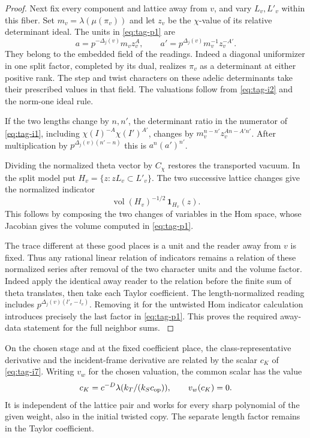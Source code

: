 \begin{proof}

Next fix every component and lattice away from \(v\), and vary
\(L_v,L'_v\) within this fiber. Set \(m_v=\lambda(\mu(\pi_v))\)
and let \(z_v\) be the \(\chi\)-value of its relative
determinant ideal. The units in \eqref{eq:tag-p1} are
\[
     a=p^{-\Delta_j(v)}m_v z_v^{A},
   \qquad a'=p^{\Delta_j(v)}m_v^{-1}z_v^{-A'} .
 \tag{I6}\label{eq:tag-i6}
\]
They belong to the embedded field of the readings. Indeed a
diagonal uniformizer in one split factor, completed by its dual,
realizes \(\pi_v\) as a determinant at either positive rank.
The step and twist characters on these adelic determinants take
their prescribed values in that field. The valuations follow from
\eqref{eq:tag-i2} and the norm-one ideal rule.

If the two lengths change by
\(n,n'\), the determinant ratio in the numerator of \eqref{eq:tag-i1},
including \(\chi(I)^{-A}\chi(I')^{A'}\), changes by
\(m_v^{n-n'}z_v^{An-A'n'}\). After multiplication by
\(p^{\Delta_j(v)(n'-n)}\) this is \(a^n(a')^{n'}\).


Dividing the normalized theta vector by \(C_\chi\) restores the
transported vacuum. In the split model put \(H_v=\{z:zL_v\subset L'_v\}\). The two successive lattice changes give the normalized indicator
\[
  \operatorname{vol}(H_v)^{-1/2}\,\mathbf1_{H_v}(z).
\]
 This follows by composing the two changes of variables
in the Hom space, whose Jacobian gives the volume computed in
\eqref{eq:tag-p1}.

The trace different at these good places is a unit and
the reader away from \(v\) is fixed. Thus any rational linear
relation of indicators remains a relation of these normalized
series after removal of the two character units and the volume
factor. Indeed apply the identical away reader to the relation
before the finite sum of theta translates, then take each Taylor
coefficient. The length-normalized reading includes
\(p^{\Delta_j(v)(l'_v-l_v)}\). Removing it for the untwisted Hom
indicator calculation introduces precisely the last factor in
\eqref{eq:tag-p1}. This proves the required away-data statement for the full
neighbor sums. \label{cor:incident-sections-4}

\end{proof}

\begin{proposition}\label{prop:incident-reading-scalar}
On the chosen stage and at the fixed coefficient place, the
class-representative derivative and the incident-frame derivative
are related by the scalar \(c_K\) of \textup{\eqref{eq:tag-i7}}. Writing \(v_w\) for the chosen valuation, the common scalar has the value
\[
 c_K=c^{-D}\lambda(k_T/(k_S c_{\rm op})),\qquad v_w(c_K)=0.
\]
It is independent of the lattice pair and works for every sharp polynomial of the given weight, also in the initial twisted copy. The separate length factor remains in the Taylor coefficient.
\end{proposition}

